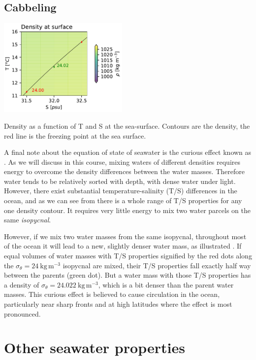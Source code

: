 \subsection{Cabbeling}

\begin{marginfigure}
    \includegraphics[width=2.5in]{./figs/Cabelling.pdf}
    \caption{Density as a function of T and S at the sea-surface.  Contours are the density, the red line is the freezing point at the sea surface.  }
    \label{fig:Cabelling}  
\end{marginfigure}

A final note about the equation of state of seawater is the curious effect known as . As we will discuss in this course, mixing waters of different densities requires energy to overcome the density differences between the water masses.  Therefore water tends to be relatively sorted with depth, with dense water under light.  However, there exist substantial temperature-salinity (T/S) differences in the ocean, and as we can see from  there is a whole range of T/S properties for any one density contour. It requires very little energy to mix two water parcels on the same \emph{isopycnal}.

However, if we mix two water masses from the same isopycnal, throughout most of the ocean it will lead to a new, slightly denser water mass, as illustrated .  If equal volumes of water masses with T/S properties signified by the red dots along the $\sigma_{\theta} = 24\ \mathrm{kg\,m^{-3}}$ isopycnal are mixed, their T/S properties fall exactly half way between the parents (green dot). But a water mass with those T/S properties has a density of $\sigma_{\theta} = 24.022\ \mathrm{kg\,m^{-3}}$, which is a bit denser than the parent water masses.  This curious effect is believed to cause circulation in the ocean, particularly near sharp fronts and at high latitudes where the effect is most pronounced.   

\section{Other seawater properties}

